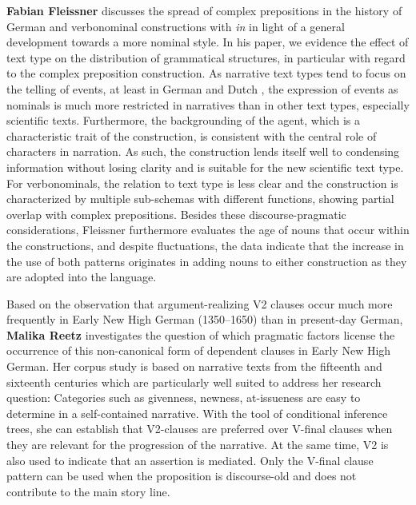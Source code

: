 \documentclass[output=paper,colorlinks,citecolor=brown]{langscibook}
\begin{document}
\bigskip
\noindent
\textbf{Fabian Fleissner} discusses the spread of complex prepositions in the history of German and verbonominal constructions  with \textit{in} in light of a general development towards a more nominal style. In his paper, we evidence the effect of text type on the distribution of grammatical structures, in particular with regard to the complex preposition construction. As narrative text types tend to focus on the telling of events, at least in German and Dutch \citep{carroll2004language}, the expression of events as nominals is much more restricted in narratives than in other text types, especially scientific texts. Furthermore, the backgrounding of the agent, which is a characteristic trait of the construction, is consistent with the central role of characters in narration. As such, the construction lends itself well to condensing information without losing clarity and is suitable for the new scientific text type. For verbonominals, the relation to text type is less clear and the construction is characterized by multiple sub-schemas with different functions, showing partial overlap with complex prepositions. Besides these discourse-pragmatic considerations, Fleissner furthermore evaluates the age of nouns that occur within the constructions, and despite fluctuations, the data indicate that the increase in the use of both patterns originates in adding nouns to either construction as they are adopted into the language.

\bigskip
\noindent
Based on the observation that argument-realizing V2 clauses occur much more frequently in Early New High German (1350--1650) than in present-day German, \textbf{Malika Reetz} investigates the question of which pragmatic factors license the occurrence of this non-canonical form of dependent clauses in Early New High German. Her corpus study is based on narrative texts from the fifteenth and sixteenth centuries which are particularly well suited to address her research question: Categories such as givenness, newness, at-issueness are easy to determine in a self-contained narrative. With the tool of conditional inference trees, she can establish that V2-clauses are preferred over V-final clauses when they are relevant for the progression of the narrative. At the same time, V2 is also used to indicate that an assertion is mediated. Only the V-final clause pattern can be used when the proposition is discourse-old and does not contribute to the main story line. 
\end{document}
